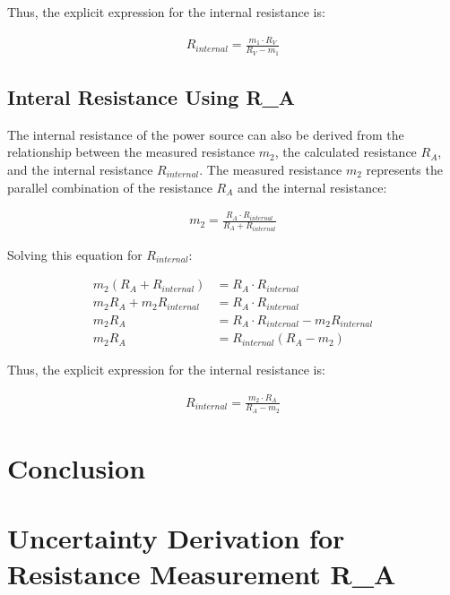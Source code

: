 \documentclass{article} %
\begin{document}
Thus, the explicit expression for the internal resistance is:

\begin{align*}
R_{internal} = \frac{m_1 \cdot R_V}{R_V - m_1}
\end{align*}

\subsection{Interal Resistance Using R\_A}

The internal resistance of the power source can also be derived from the relationship between the measured resistance $m_2$, the calculated resistance $R_A$, and the internal resistance $R_{internal}$. 
The measured resistance $m_2$ represents the parallel combination of the resistance $R_A$ and the internal resistance:

\begin{align*}
m_2 = \frac{R_A \cdot R_{internal}}{R_A + R_{internal}}
\end{align*}

Solving this equation for $R_{internal}$:

\begin{align*}
m_2 (R_A + R_{internal}) &= R_A \cdot R_{internal} \\
m_2 R_A + m_2 R_{internal} &= R_A \cdot R_{internal} \\
m_2 R_A &= R_A \cdot R_{internal} - m_2 R_{internal} \\
m_2 R_A &= R_{internal} (R_A - m_2)
\end{align*}

Thus, the explicit expression for the internal resistance is:

\begin{align*}
R_{internal} = \frac{m_2 \cdot R_A}{R_A - m_2}
\end{align*}

\section{Conclusion}

\label{last_page}

\newpage
% 
% 

\appendix

\section{Uncertainty Derivation for Resistance Measurement R\_A}
\label{app:a_RA_uncertainty}
\end{document}
